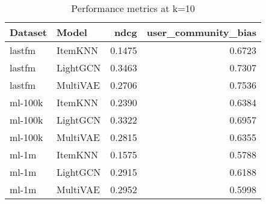 \begin{table}[htbp]
\centering
\caption{Performance metrics at k=10}
\begin{tabular}{llrr}
\toprule
Dataset & Model & ndcg & user_community_bias \\
\midrule
lastfm & ItemKNN & 0.1475 & 0.6723 \\
lastfm & LightGCN & 0.3463 & 0.7307 \\
lastfm & MultiVAE & 0.2706 & 0.7536 \\
ml-100k & ItemKNN & 0.2390 & 0.6384 \\
ml-100k & LightGCN & 0.3322 & 0.6957 \\
ml-100k & MultiVAE & 0.2815 & 0.6355 \\
ml-1m & ItemKNN & 0.1575 & 0.5788 \\
ml-1m & LightGCN & 0.2915 & 0.6188 \\
ml-1m & MultiVAE & 0.2952 & 0.5998 \\
\bottomrule
\end{tabular}
\end{table}